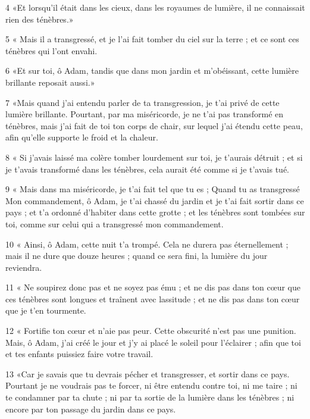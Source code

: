 \par 4 «Et lorsqu'il était dans les cieux, dans les royaumes de lumière, il ne connaissait rien des ténèbres.»

\par 5 « Mais il a transgressé, et je l'ai fait tomber du ciel sur la terre ; et ce sont ces ténèbres qui l’ont envahi.

\par 6 «Et sur toi, ô Adam, tandis que dans mon jardin et m'obéissant, cette lumière brillante reposait aussi.»

\par 7 «Mais quand j'ai entendu parler de ta transgression, je t'ai privé de cette lumière brillante. Pourtant, par ma miséricorde, je ne t'ai pas transformé en ténèbres, mais j'ai fait de toi ton corps de chair, sur lequel j'ai étendu cette peau, afin qu'elle supporte le froid et la chaleur.

\par 8 « Si j'avais laissé ma colère tomber lourdement sur toi, je t'aurais détruit ; et si je t'avais transformé dans les ténèbres, cela aurait été comme si je t'avais tué.

\par 9 « Mais dans ma miséricorde, je t'ai fait tel que tu es ; Quand tu as transgressé Mon commandement, ô Adam, je t'ai chassé du jardin et je t'ai fait sortir dans ce pays ; et t'a ordonné d'habiter dans cette grotte ; et les ténèbres sont tombées sur toi, comme sur celui qui a transgressé mon commandement.

\par 10 « Ainsi, ô Adam, cette nuit t'a trompé. Cela ne durera pas éternellement ; mais il ne dure que douze heures ; quand ce sera fini, la lumière du jour reviendra.

\par 11 « Ne soupirez donc pas et ne soyez pas ému ; et ne dis pas dans ton cœur que ces ténèbres sont longues et traînent avec lassitude ; et ne dis pas dans ton cœur que je t'en tourmente.

\par 12 « Fortifie ton cœur et n'aie pas peur. Cette obscurité n'est pas une punition. Mais, ô Adam, j'ai créé le jour et j'y ai placé le soleil pour l'éclairer ; afin que toi et tes enfants puissiez faire votre travail.

\par 13 «Car je savais que tu devrais pécher et transgresser, et sortir dans ce pays. Pourtant je ne voudrais pas te forcer, ni être entendu contre toi, ni me taire ; ni te condamner par ta chute ; ni par ta sortie de la lumière dans les ténèbres ; ni encore par ton passage du jardin dans ce pays.

